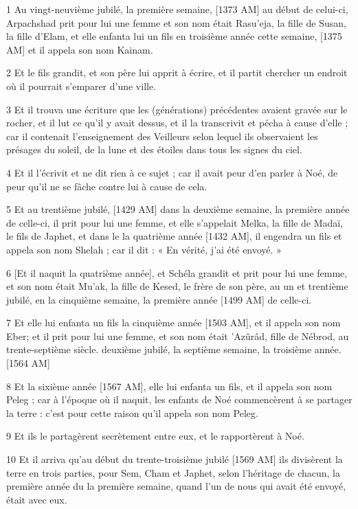 \par 1 Au vingt-neuvième jubilé, la première semaine, [1373 AM] au début de celui-ci, Arpachshad prit pour lui une femme et son nom était Rasu'eja, la fille de Susan, la fille d'Elam, et elle enfanta lui un fils en troisième année cette semaine, [1375 AM] et il appela son nom Kainam.
\par 2 Et le fils grandit, et son père lui apprit à écrire, et il partit chercher un endroit où il pourrait s'emparer d'une ville.
\par 3 Et il trouva une écriture que les (générations) précédentes avaient gravée sur le rocher, et il lut ce qu'il y avait dessus, et il la transcrivit et pécha à cause d'elle ; car il contenait l'enseignement des Veilleurs selon lequel ils observaient les présages du soleil, de la lune et des étoiles dans tous les signes du ciel.
\par 4 Et il l'écrivit et ne dit rien à ce sujet ; car il avait peur d'en parler à Noé, de peur qu'il ne se fâche contre lui à cause de cela.
\par 5 Et au trentième jubilé, [1429 AM] dans la deuxième semaine, la première année de celle-ci, il prit pour lui une femme, et elle s'appelait Melka, la fille de Madaï, le fils de Japhet, et dans le la quatrième année [1432 AM], il engendra un fils et appela son nom Shelah ; car il dit : « En vérité, j'ai été envoyé. »
\par 6 [Et il naquit la quatrième année], et Schéla grandit et prit pour lui une femme, et son nom était Mu'ak, la fille de Kesed, le frère de son père, au un et trentième jubilé, en la cinquième semaine, la première année [1499 AM] de celle-ci.
\par 7 Et elle lui enfanta un fils la cinquième année [1503 AM], et il appela son nom Eber; et il prit pour lui une femme, et son nom était 'Azûrâd, fille de Nébrod, au trente-septième siècle. deuxième jubilé, la septième semaine, la troisième année. [1564 AM]
\par 8 Et la sixième année [1567 AM], elle lui enfanta un fils, et il appela son nom Peleg ; car à l'époque où il naquit, les enfants de Noé commencèrent à se partager la terre : c'est pour cette raison qu'il appela son nom Peleg.
\par 9 Et ils le partagèrent secrètement entre eux, et le rapportèrent à Noé.
\par 10 Et il arriva qu'au début du trente-troisième jubilé [1569 AM] ils divisèrent la terre en trois parties, pour Sem, Cham et Japhet, selon l'héritage de chacun, la première année du la première semaine, quand l'un de nous qui avait été envoyé, était avec eux.
